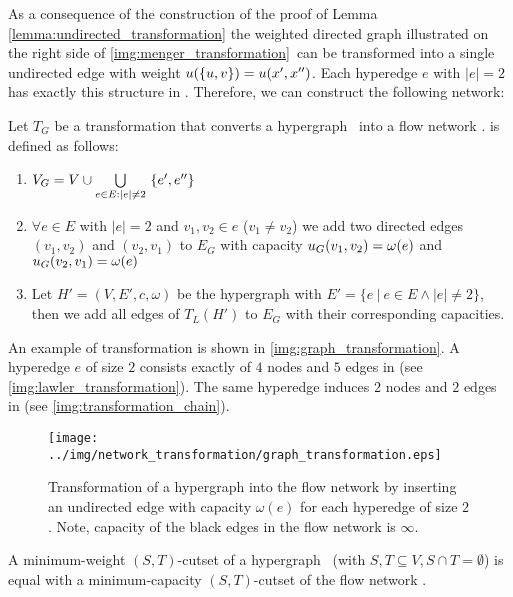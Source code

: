 As a consequence of the construction of the proof of Lemma \ref{lemma:undirected_transformation}
the weighted directed graph illustrated on the right side of
\autoref{img:menger_transformation}~can be transformed into a single undirected edge with weight
$u(\{u,v\}) = u(x',x'')$.
Each hyperedge $e$ with $|e| = 2$ has exactly this structure in . Therefore, we can 
construct the following network:

\begin{definition}
Let $T_G$ be a transformation that converts a hypergraph \HypergraphDef~into 
a flow network .  is defined as follows:
\begin{enumerate}
\item $V_G = V \cup \bigcup\limits_{\substack{e \in E: |e| \neq 2}}\ \{e', e''\}$
\item $\forall e \in E$ with $|e| = 2$ and $v_1,v_2 \in e$ ($v_1 \neq v_2$) we add 
      two directed edges $(v_1,v_2)$ and $(v_2,v_1)$ to $E_G$ with capacity $u_G(v_1,v_2) = \omega(e)$
      and $u_G(v_2,v_1) = \omega(e)$
\item Let $H' = (V,E',c,\omega)$ be the hypergraph with $E' = \{e\ |\ e \in E \land |e| \neq 2\}$,
      then we add all edges of $T_L(H')$ to $E_G$ with their corresponding capacities.
\end{enumerate} 
\end{definition}

An example of transformation  is shown in \autoref{img:graph_transformation}. A hyperedge
$e$ of size $2$ consists exactly of $4$ nodes and $5$ edges in  (see \autoref{img:lawler_transformation}).
The same hyperedge induces $2$ nodes and $2$ edges in  (see \autoref{img:transformation_chain}). 
 
\begin{figure}
\centering
\texttt{[image: ../img/network\_transformation/graph\_transformation.eps]}
\caption{Transformation of a hypergraph into the flow network  by inserting 
         an undirected edge with capacity $\omega(e)$ for each hyperedge of size $2$. 
         Note, capacity of the black edges in the flow network is $\infty$.}
\label{img:graph_transformation}
\end{figure}

\begin{theorem}
A minimum-weight $(S,T)$-cutset of a hypergraph \HypergraphDef~(with $S,T \subseteq V,
S \cap T = \emptyset$) is equal with a minimum-capacity $(S,T)$-cutset of the
flow network .
\label{theorem:graph_transformation}
\end{theorem}

